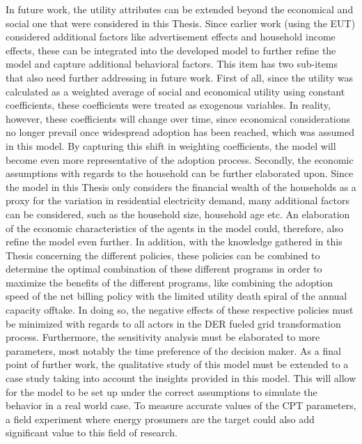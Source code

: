 \newline \newline \noindent
In future work, the utility attributes can be extended beyond the economical and social one that were considered in this Thesis. Since earlier work (using the EUT) considered additional factors like advertisement effects and household income effects, these can be integrated into the developed model to further refine the model and capture additional behavioral factors. This item has two sub-items that also need further addressing in future work.
\newline \newline \noindent
First of all, since the utility was calculated as a weighted average of social and economical utility using constant coefficients, these coefficients were treated as exogenous variables. In reality, however, these coefficients will change over time, since economical considerations no longer prevail once widespread adoption has been reached, which was assumed in this model. By capturing this shift in weighting coefficients, the model will become even more representative of the adoption process. 
\newline \newline
Secondly, the economic assumptions with regards to the household can be further elaborated upon. Since the model in this Thesis only considers the financial wealth of the households as a proxy for the variation in residential electricity demand, many additional factors can be considered, such as the household size, household age etc. An elaboration of the economic characteristics of the agents in the model could, therefore, also refine the model even further. 
\newline \newline \noindent
In addition, with the knowledge gathered in this Thesis concerning the different policies, these policies can be combined to determine the optimal combination of these different programs in order to maximize the benefits of the different programs, like combining the adoption speed of the net billing policy with the limited utility death spiral of the annual capacity offtake. In doing so, the negative effects of these respective policies must be minimized with regards to all actors in the DER fueled grid transformation process. Furthermore, the sensitivity analysis must be elaborated to more parameters, most notably the time preference of the decision maker. 
\newline \newline \noindent
As a final point of further work, the qualitative study of this model must be extended to a case study taking into account the insights provided in this model. This will allow for the model to be set up under the correct assumptions to simulate the behavior in a real world case. To measure accurate values of the CPT parameters, a field experiment where energy prosumers are the target could also add significant value to this field of research. 





